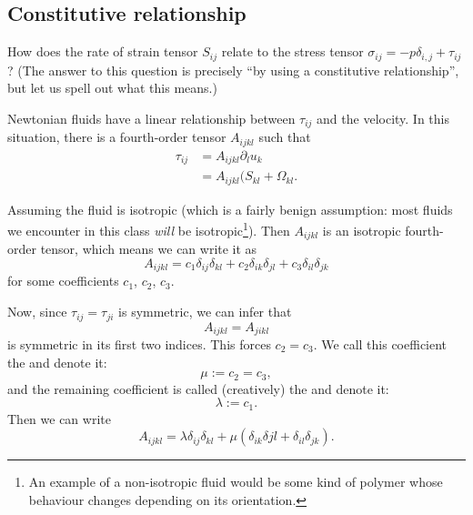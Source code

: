 \subsection{Constitutive relationship}

\begin{puzzle}
How does the rate of strain tensor $S_{ij}$ relate to the stress
tensor $\sigma_{ij}=-p\delta_{i,j}+\tau_{ij}$? (The answer to this
question is precisely ``by using a constitutive relationship'', but
let us spell out what this means.)
\end{puzzle}

\begin{node}
Newtonian fluids have a linear relationship between $\tau_{ij}$ and
the velocity. In this situation, there is a fourth-order tensor
$A_{ijkl}$ such that
\begin{subequations}
  \begin{align}
\tau_{ij} &= A_{ijkl}\partial_{l}u_{k}\\
&=A_{ijkl}(S_{kl}+\Omega_{kl}.
  \end{align}
\end{subequations}
\end{node}

\begin{node}
Assuming the fluid is isotropic (which is a fairly benign assumption:
most fluids we encounter in this class \emph{will} be
isotropic\footnote{An example of a non-isotropic fluid would be some
kind of polymer whose behaviour changes depending on its
orientation.}). Then $A_{ijkl}$ is an isotropic fourth-order tensor,
which means we can write it as
\begin{equation}
A_{ijkl}=c_{1}\delta_{ij}\delta_{kl}+c_{2}\delta_{ik}\delta_{jl}+c_{3}\delta_{il}\delta_{jk}
\end{equation}
for some coefficients $c_{1}$, $c_{2}$, $c_{3}$.
\end{node}

\begin{node}
Now, since $\tau_{ij}=\tau_{ji}$ is symmetric, we can infer that
\begin{equation}
A_{ijkl}=A_{jikl}
\end{equation}
is symmetric in its first two indices. This forces $c_{2}=c_{3}$. We
call this coefficient the  and denote it:
\begin{equation}
\mu:=c_{2}=c_{3},
\end{equation}
and the remaining coefficient is called (creatively) the
 and denote it:
\begin{equation}
\lambda:=c_{1}.
\end{equation}
Then we can write
\begin{equation}
A_{ijkl}=\lambda\delta_{ij}\delta_{kl}+\mu(\delta_{ik}\delta{jl}+\delta_{il}\delta_{jk}).
\end{equation}
\end{node}

